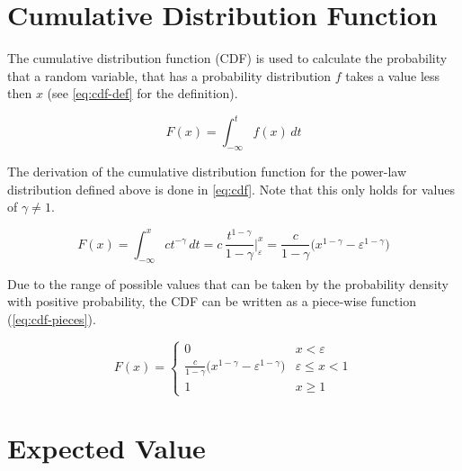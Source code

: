 

\section{Cumulative Distribution Function}
\label{sec:cdf}

The cumulative distribution function (CDF) is used to calculate the probability that a random variable, that has a probability distribution \(f\) takes a value less then \(x\) (see \cref{eq:cdf-def} for the definition).

\begin{equation}
	F(x) = \int_{-\infty}^{t} f(x) \, dt
	\label{eq:cdf-def}
\end{equation}

The derivation of the cumulative distribution function for the power-law distribution defined above is done in \cref{eq:cdf}.
Note that this only holds for values of \(\gamma \neq 1\).

\begin{equation}
	F(x) = \int_{-\infty}^{x} ct^{-\gamma} \, dt = c \, \frac{t^{1-\gamma}}{1-\gamma}  \bigg |_{\varepsilon}^{x} = \frac{c}{1-\gamma} \Big( x^{1 - \gamma} - \varepsilon^{1 - \gamma} \Big)
	\label{eq:cdf}
\end{equation}

Due to the range of possible values that can be taken by the probability density with positive probability, the CDF can be written as a piece-wise function (\cref{eq:cdf-pieces}).

\begin{equation}
	F(x) =
	\begin{cases}
		0                                                                        & x < \varepsilon        \\
		\frac{c}{1-\gamma} \Big( x^{1 - \gamma} - \varepsilon^{1 - \gamma} \Big) & \varepsilon \leq x < 1 \\
		1                                                                        & x \geq 1
	\end{cases}
	\label{eq:cdf-pieces}
\end{equation}




\section{Expected Value}
\label{sec:expected-value}

